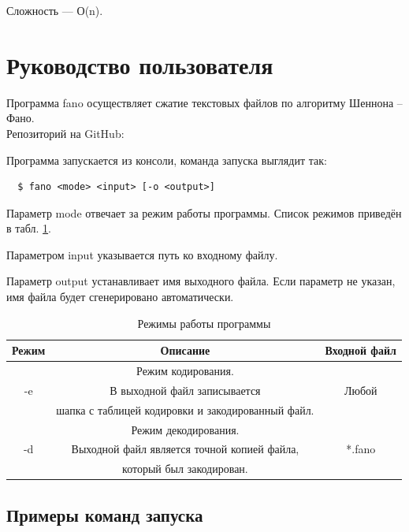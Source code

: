 \documentclass{article}
\begin{document}
Сложность --- О(n).

\section{Руководство пользователя}

Программа fano осуществляет сжатие текстовых файлов по алгоритму Шеннона – Фано.\\

Репозиторий на GitHub: 

\vspace{2em}
Программа запускается из консоли, команда запуска выглядит так:

\begin{lstlisting}
  $ fano <mode> <input> [-o <output>]
\end{lstlisting}

Параметр mode отвечает за режим работы программы. Список режимов приведён в табл. \ref{modes}.



Параметром input указывается путь ко входному файлу.

Параметр output устанавливает имя выходного файла. Если параметр не указан, имя файла будет сгенерировано автоматически.

\begin{table}
 \begin{center}
  \begin{tabular}{|c|c|c|}
   \hline
   Режим & Описание & Входной файл\\
   \hline
    & Режим кодирования.  & \\ 
   -e & В выходной файл записывается & Любой \\
    & шапка с таблицей кодировки и закодированный файл. & \\
   \hline
    & Режим декодирования. & \\
   -d & Выходной файл является точной копией файла, & *.fano\\ 
    & который был закодирован. & \\
   \hline
  \end{tabular}

 \end{center}
  \caption{Режимы работы программы\label{modes}}
\end{table}

\subsection{Примеры команд запуска}
\end{document}
